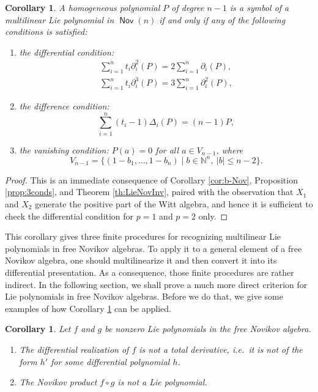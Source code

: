 \documentclass[11pt,reqno]{amsart}
\theoremstyle{plain}
\newtheorem{corollary}[theorem]{Corollary}
\theoremstyle{definition}
\theoremstyle{remark}
\DeclareMathOperator{\Nov}{\mathsf{Nov}}
\begin{document}
\begin{corollary}\label{cor:criterion-symbols}
A homogeneous polynomial $P$ of degree $n-1$ is a symbol of a multilinear Lie polynomial in $\Nov(n)$ if and only if any of the following conditions is satisfied:
\begin{enumerate}
\item the differential condition:
\begin{gather}
\sum_{i=1}^n t_i\partial_i^2(P)=2\sum_{i=1}^n\partial_i(P),\label{eq:invDifOp-PDE-minus-one-1}\\
\sum_{i=1}^n t_i\partial_i^3(P)=3\sum_{i=1}^n\partial_i^2(P),\label{eq:invDifOp-PDE-minus-one-2}
\end{gather}
\item the difference condition: \begin{equation}\label{eq:invDifOp-difference-minus-one}
\sum_{i=1}^n(t_i-1)\Delta_i(P)=(n-1)P,
\end{equation}
\item the vanishing condition: $P(a)=0$ for all $a\in V_{n-1}$, where
 \[
V_{n-1}= \bigl\{(1-b_1,\ldots,1-b_n)
\mid b\in\mathbb{N}^n,\ |b|\le n-2\bigr\} .
 \]
\end{enumerate}
\end{corollary}

\begin{proof}
This is an immediate consequence of Corollary \ref{cor:b-Nov}, Proposition \ref{prop:3conds}, and Theorem \ref{th:LieNovInv}, paired with the observation that $X_1$ and $X_2$ generate the positive part of the Witt algebra, and hence it is sufficient to check the differential condition for $p=1$ and $p=2$ only.
\end{proof}

This corollary gives three finite procedures for recognizing multilinear Lie polynomials in free Novikov algebras. To apply it to a general element of a free Novikov algebra, one should multilinearize it and then convert it into its differential presentation. As a consequence, those finite procedures are rather indirect. In the following section, we shall prove a much more direct criterion for Lie polynomials in free Novikov algebras. Before we do that, we give some examples of how Corollary \ref{cor:criterion-symbols} can be applied. 

\begin{corollary}\label{cor:no-deriv}
Let $f$ and $g$ be nonzero Lie polynomials in the free Novikov algebra. 
\begin{enumerate}
\item The differential realization of $f$ is not a total derivative, i.e.\ it is not of the form $h'$ for some differential polynomial $h$.
\item The Novikov product $f\circ g$ is not a Lie polynomial.
\end{enumerate} 
\end{corollary}
\end{document}
